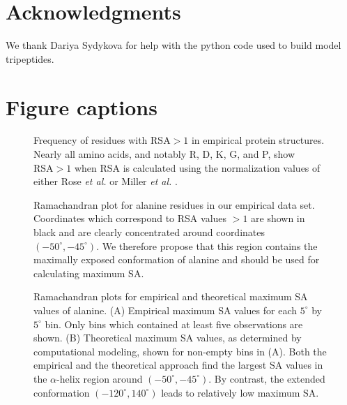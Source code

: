 \documentclass[11pt]{article}
\begin{document}
\section*{Acknowledgments}
We thank Dariya Sydykova for help with the python code used to build model tripeptides.






\newpage

\section*{Figure captions}

\begin{figure}[H]
\caption{\label{fig:BarGraphRSA}Frequency of residues with $\text{RSA}>1$ in empirical protein structures. Nearly all amino acids, and notably R, D, K, G, and P, show $\text{RSA}>1$ 
when RSA is calculated using the normalization values of either Rose \emph{et al.} \cite{Rose1985} or Miller \emph{et al.} \cite{Miller1987}.}
\end{figure}

\begin{figure}[H]
\caption{\label{fig:RamaAla}Ramachandran plot for alanine residues in our empirical data set. Coordinates which correspond to RSA values $>1$ are shown in black and are clearly concentrated around coordinates $(-50^\circ,-45^\circ)$. We therefore propose that this region contains the maximally exposed conformation of alanine and should be used for calculating maximum SA.}
\end{figure}

\begin{figure}[H]
\caption{\label{fig:heatrama} Ramachandran plots for empirical and theoretical maximum SA values of alanine. (A) Empirical maximum SA values for each $5^\circ$ by $5^\circ$ bin. Only bins which contained at least five observations are shown. (B) Theoretical maximum SA values, as determined by computational modeling, shown for non-empty bins in (A). Both the empirical and the theoretical approach find the largest SA values in the $\alpha$-helix region around $(-50^\circ,-45^\circ)$. By contrast, the extended conformation $(-120^\circ, 140^\circ)$ leads to relatively low maximum SA.}
\end{figure}
\end{document}
